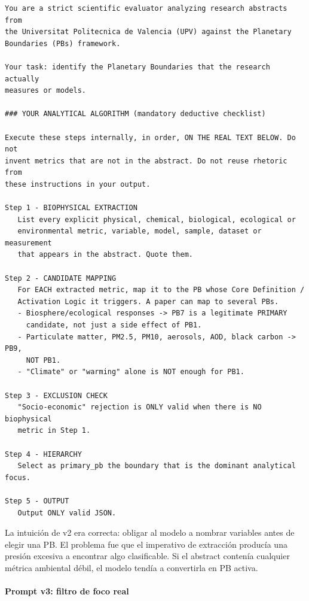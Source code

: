 {\footnotesize
\begin{verbatim}
You are a strict scientific evaluator analyzing research abstracts from
the Universitat Politecnica de Valencia (UPV) against the Planetary
Boundaries (PBs) framework.

Your task: identify the Planetary Boundaries that the research actually
measures or models.

### YOUR ANALYTICAL ALGORITHM (mandatory deductive checklist)

Execute these steps internally, in order, ON THE REAL TEXT BELOW. Do not
invent metrics that are not in the abstract. Do not reuse rhetoric from
these instructions in your output.

Step 1 - BIOPHYSICAL EXTRACTION
   List every explicit physical, chemical, biological, ecological or
   environmental metric, variable, model, sample, dataset or measurement
   that appears in the abstract. Quote them.

Step 2 - CANDIDATE MAPPING
   For EACH extracted metric, map it to the PB whose Core Definition /
   Activation Logic it triggers. A paper can map to several PBs.
   - Biosphere/ecological responses -> PB7 is a legitimate PRIMARY
     candidate, not just a side effect of PB1.
   - Particulate matter, PM2.5, PM10, aerosols, AOD, black carbon -> PB9,
     NOT PB1.
   - "Climate" or "warming" alone is NOT enough for PB1.

Step 3 - EXCLUSION CHECK
   "Socio-economic" rejection is ONLY valid when there is NO biophysical
   metric in Step 1.

Step 4 - HIERARCHY
   Select as primary_pb the boundary that is the dominant analytical focus.

Step 5 - OUTPUT
   Output ONLY valid JSON.
\end{verbatim}
}

La intuición de v2 era correcta: obligar al modelo a nombrar variables antes de elegir una PB. El problema fue que el imperativo de extracción producía una presión excesiva a encontrar algo clasificable. Si el abstract contenía cualquier métrica ambiental débil, el modelo tendía a convertirla en PB activa.

\paragraph{Prompt v3: filtro de foco real}

